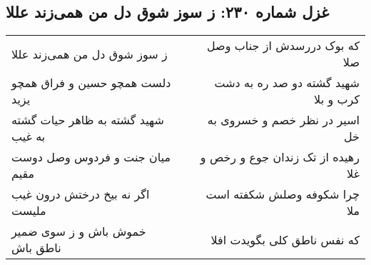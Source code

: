 \begin{center}
\section*{غزل شماره ۲۳۰: ز سوز شوق دل من همی‌زند عللا}
\label{sec:0230}
\begin{longtable}{l p{0.5cm} r}
ز سوز شوق دل من همی‌زند عللا
&&
که بوک دررسدش از جناب وصل صلا
\\
دلست همچو حسین و فراق همچو یزید
&&
شهید گشته دو صد ره به دشت کرب و بلا
\\
شهید گشته به ظاهر حیات گشته به غیب
&&
اسیر در نظر خصم و خسروی به خل
\\
میان جنت و فردوس وصل دوست مقیم
&&
رهیده از تک زندان جوع و رخص و غلا
\\
اگر نه بیخ درختش درون غیب ملیست
&&
چرا شکوفه وصلش شکفته است ملا
\\
خموش باش و ز سوی ضمیر ناطق باش
&&
که نفس ناطق کلی بگویدت افلا
\\
\end{longtable}
\end{center}
